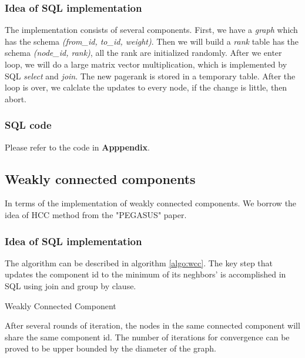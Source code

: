 \subsubsection{Idea of SQL implementation}
The implementation consists of several components.
First, we have a \emph{graph} which has the schema \emph{(from\_id, to\_id, weight)}. Then we will build a \emph{rank} table has the schema \emph{(node\_id, rank)}, all the rank are initialized randomly. After we enter loop, we will do a large matrix vector multiplication, which is implemented by SQL \emph{select} and \emph{join}. The new pagerank is stored in a temporary table. After the loop is over, we calclate the updates to every node, if the change is little, then abort.

\subsubsection{SQL code}
Please refer to the code in {\bf Apppendix}.

\subsection{Weakly connected components}
In terms of the implementation of weakly connected components. We borrow the idea of HCC method from the "PEGASUS" paper.\cite{Kang09}

\subsubsection{Idea of SQL implementation}
The algorithm can be described in algorithm \ref{algo:wcc}. The key step that updates the 
component id to the minimum of its neghbors' is accomplished in SQL using join and group by
clause.
\begin{algorithm}
\caption{Weakly Connected Component}
\begin{algorithmic}
\REPEAT
{}
\end{algorithmic}
\label{algo:wcc}
\end{algorithm}
After several rounds of iteration, the nodes in the same connected component will share the same component id.
The number of iterations for convergence can be proved to be upper bounded by the diameter of the graph.


